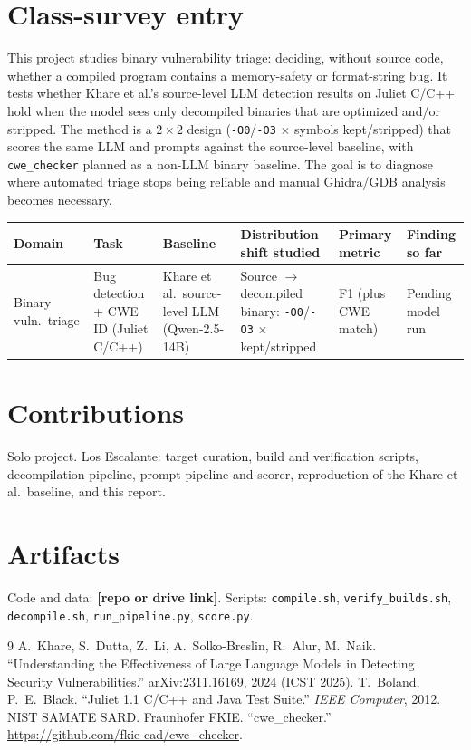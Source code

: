 \documentclass[10pt]{article}
\newcommand{\placeholder}[1]{{\color{red}\textbf{[#1]}}}
\begin{document}
\section*{Class-survey entry}
This project studies binary vulnerability triage: deciding, without source code,
whether a compiled program contains a memory-safety or format-string bug. It
tests whether Khare et al.'s source-level LLM detection results on Juliet C/C++
hold when the model sees only decompiled binaries that are optimized and/or
stripped. The method is a $2\times2$ design (\texttt{-O0}/\texttt{-O3} $\times$
symbols kept/stripped) that scores the same LLM and prompts against the
source-level baseline, with \texttt{cwe\_checker} planned as a non-LLM binary
baseline. The goal is to diagnose where automated triage stops being reliable
and manual Ghidra/GDB analysis becomes necessary.

\begin{center}\small
\begin{tabular}{@{}p{1.6cm}p{2.0cm}p{2.2cm}p{2.6cm}p{1.6cm}p{1.6cm}@{}}
\toprule
Domain & Task & Baseline & Distribution shift studied & Primary metric & Finding so far \\
\midrule
Binary vuln.\ triage & Bug detection + CWE ID (Juliet C/C++) & Khare et al.\ source-level LLM (Qwen-2.5-14B) &
Source $\to$ decompiled binary: \texttt{-O0}/\texttt{-O3} $\times$ kept/stripped & F1 (plus CWE match) & Pending model run \\
\bottomrule
\end{tabular}
\end{center}

\section*{Contributions}
Solo project. Los Escalante: target curation, build and verification scripts,
decompilation pipeline, prompt pipeline and scorer, reproduction of the Khare
et al.\ baseline, and this report.

\section*{Artifacts}
Code and data: \placeholder{repo or drive link}. Scripts: \texttt{compile.sh},
\texttt{verify\_builds.sh}, \texttt{decompile.sh}, \texttt{run\_pipeline.py},
\texttt{score.py}.

\begin{thebibliography}{9}
 A.~Khare, S.~Dutta, Z.~Li, A.~Solko-Breslin, R.~Alur, M.~Naik.
``Understanding the Effectiveness of Large Language Models in Detecting Security
Vulnerabilities.'' arXiv:2311.16169, 2024 (ICST 2025).
 T.~Boland, P.~E.~Black. ``Juliet 1.1 C/C++ and Java Test Suite.''
\textit{IEEE Computer}, 2012. NIST SAMATE SARD.
 Fraunhofer FKIE. ``cwe\_checker.''
\url{https://github.com/fkie-cad/cwe_checker}.
\end{thebibliography}
\end{document}
